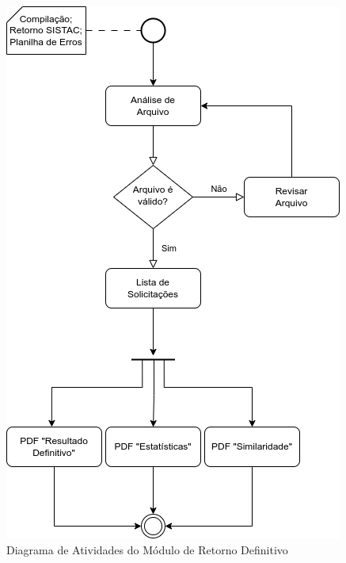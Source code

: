 \documentclass[
	12pt,			%
	openright,		%
	oneside,	
	a4paper,		%
	english,		%
	brazil			%
]{abntex2/abntex2}  %
\begin{document}
		\clearpage
		\begin{figure}[!ht]
			\begin{center}
				
				\caption{Diagrama de Atividades do Módulo de Retorno Definitivo}
				\includegraphics[scale=0.85]{img/diagrama-ativs-definitivo}
				
			\end{center}
		\end{figure}
		
\end{document}
